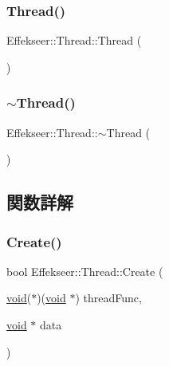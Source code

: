 \subsubsection{\texorpdfstring{Thread()}{Thread()}}
{\footnotesize\ttfamily Effekseer\+::\+Thread\+::\+Thread (\begin{DoxyParamCaption}{ }\end{DoxyParamCaption})}

\mbox{\label{class_effekseer_1_1_thread_a5e081a4312fd66ffd9e26aea3b177297}} 
\subsubsection{\texorpdfstring{$\sim$\+Thread()}{~Thread()}}
{\footnotesize\ttfamily Effekseer\+::\+Thread\+::$\sim$\+Thread (\begin{DoxyParamCaption}{ }\end{DoxyParamCaption})}



\subsection{関数詳解}
\mbox{\label{class_effekseer_1_1_thread_af30613ba2b4e0f929fb70e71f820b394}} 
\subsubsection{\texorpdfstring{Create()}{Create()}}
{\footnotesize\ttfamily bool Effekseer\+::\+Thread\+::\+Create (\begin{DoxyParamCaption}\item[{\mbox{\hyperlink{namespace_effekseer_ab34c4088e512200cf4c2716f168deb56}{void}}($\ast$)(\mbox{\hyperlink{namespace_effekseer_ab34c4088e512200cf4c2716f168deb56}{void}} $\ast$)}]{thread\+Func,  }\item[{\mbox{\hyperlink{namespace_effekseer_ab34c4088e512200cf4c2716f168deb56}{void}} $\ast$}]{data }\end{DoxyParamCaption})}



